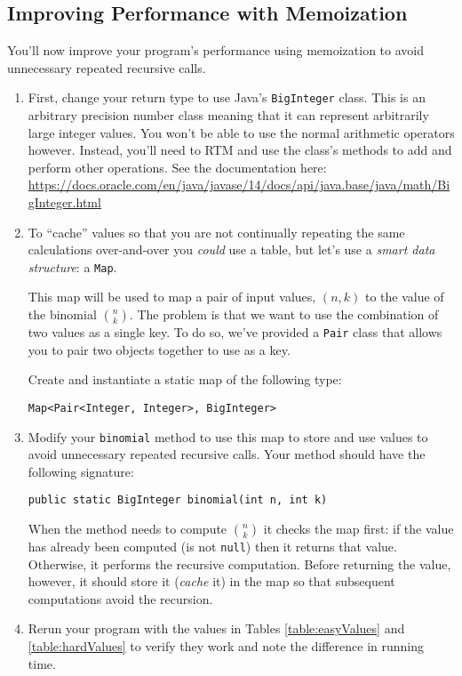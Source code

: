 \documentclass[12pt]{scrartcl}
\begin{document}
\subsection*{Improving Performance with Memoization}

You'll now improve your program's performance using memoization
to avoid unnecessary repeated recursive calls.  

\begin{enumerate}
  \item First, change your return type to use Java's \texttt{BigInteger}
  class.  This is an arbitrary precision number class meaning that it can 
  represent arbitrarily large integer values.  You won't be able to use 
  the normal arithmetic operators however.  Instead, you'll need to RTM and
  use the class's methods to add and perform other operations.  See the
  documentation here: \url{https://docs.oracle.com/en/java/javase/14/docs/api/java.base/java/math/BigInteger.html}
  \item To ``cache'' values so that you are not continually repeating the
  same calculations over-and-over you \emph{could} use a table, but let's 
  use a \emph{smart data structure}: a \texttt{Map}.
  
  This map will be used to map a pair of input values, $(n,k)$ to the
  value of the binomial ${n \choose k}$.  The problem is that we want
  to use the combination of two values as a single key.  To do so, we've
  provided a \texttt{Pair} class that allows you to pair two
  objects together to use as a key.
  
  Create and instantiate a static map of the following type:
  
  \texttt{Map<Pair<Integer, Integer>, BigInteger>} 
  
  \item Modify your \texttt{binomial} method to use this map
  to store and use values to avoid unnecessary repeated recursive calls.
  Your method should have the following signature:
  
  \texttt{public static BigInteger binomial(int n, int k)}
  
  When the method needs to compute ${n \choose k}$ it checks the map
  first: if the value has already been computed (is not \texttt{null}) then it
  returns that value.  Otherwise, it performs the recursive computation.
  Before returning the value, however, it should store it (\emph{cache}
  it) in the map so that subsequent computations avoid the recursion.  
  
  \item Rerun your program with the values in Tables \ref{table:easyValues} 
  and \ref{table:hardValues} to verify they work and note the difference
  in running time.  
\end{enumerate}
\end{document}
